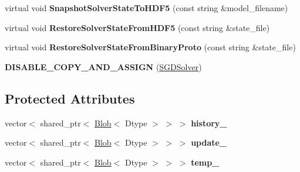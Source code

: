 \begin{DoxyCompactItemize}
\item 
virtual void {\bfseries Snapshot\+Solver\+State\+To\+H\+D\+F5} (const string \&model\+\_\+filename)\hypertarget{classcaffe_1_1SGDSolver_ad503803863708ade3162fd5d9225b9f5}{}\label{classcaffe_1_1SGDSolver_ad503803863708ade3162fd5d9225b9f5}

\item 
virtual void {\bfseries Restore\+Solver\+State\+From\+H\+D\+F5} (const string \&state\+\_\+file)\hypertarget{classcaffe_1_1SGDSolver_a5b959d966140b52c492a5096aa72ee84}{}\label{classcaffe_1_1SGDSolver_a5b959d966140b52c492a5096aa72ee84}

\item 
virtual void {\bfseries Restore\+Solver\+State\+From\+Binary\+Proto} (const string \&state\+\_\+file)\hypertarget{classcaffe_1_1SGDSolver_aa6ecd70cde5d5e9cf24e0d275200fbac}{}\label{classcaffe_1_1SGDSolver_aa6ecd70cde5d5e9cf24e0d275200fbac}

\item 
{\bfseries D\+I\+S\+A\+B\+L\+E\+\_\+\+C\+O\+P\+Y\+\_\+\+A\+N\+D\+\_\+\+A\+S\+S\+I\+GN} (\hyperlink{classcaffe_1_1SGDSolver}{S\+G\+D\+Solver})\hypertarget{classcaffe_1_1SGDSolver_a4b37f2267ebd84e62ee486470b2b0c2b}{}\label{classcaffe_1_1SGDSolver_a4b37f2267ebd84e62ee486470b2b0c2b}

\end{DoxyCompactItemize}
\subsection*{Protected Attributes}
\begin{DoxyCompactItemize}
\item 
vector$<$ shared\+\_\+ptr$<$ \hyperlink{classcaffe_1_1Blob}{Blob}$<$ Dtype $>$ $>$ $>$ {\bfseries history\+\_\+}\hypertarget{classcaffe_1_1SGDSolver_a66a7a1d7d3543e861057861be3e079a4}{}\label{classcaffe_1_1SGDSolver_a66a7a1d7d3543e861057861be3e079a4}

\item 
vector$<$ shared\+\_\+ptr$<$ \hyperlink{classcaffe_1_1Blob}{Blob}$<$ Dtype $>$ $>$ $>$ {\bfseries update\+\_\+}\hypertarget{classcaffe_1_1SGDSolver_a734d9a9af3302f62e76c30bb05d11f60}{}\label{classcaffe_1_1SGDSolver_a734d9a9af3302f62e76c30bb05d11f60}

\item 
vector$<$ shared\+\_\+ptr$<$ \hyperlink{classcaffe_1_1Blob}{Blob}$<$ Dtype $>$ $>$ $>$ {\bfseries temp\+\_\+}\hypertarget{classcaffe_1_1SGDSolver_aa6784e0dec503d8d46d6bd449d748df9}{}\label{classcaffe_1_1SGDSolver_aa6784e0dec503d8d46d6bd449d748df9}

\end{DoxyCompactItemize}


